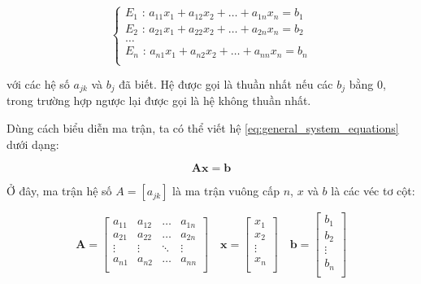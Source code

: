\documentclass[../../Lectures]{subfiles}
\begin{document}
\[\label{eq:general_system_equations}
    \begin{cases}
        E_1 \text{ : } a_{11} x_1 + a_{12} x_2 + \ldots + a_{1n} x_n = b_1 \\
        E_2 \text{ : } a_{21} x_1 + a_{22} x_2 + \ldots + a_{2n} x_n = b_2 \\
        \ldots \\
        E_n \text{ : } a_{n1} x_1 + a_{n2} x_2 + \ldots + a_{nn} x_n = b_n \\
    \end{cases}
\]

\noindent với các hệ số \(a_{jk}\) và \(b_j\) đã biết. Hệ được gọi là thuần nhất
nếu các \(b_j\) bằng \(0\), trong trường hợp ngược lại được gọi là hệ không
thuần nhất.

Dùng cách biểu diễn ma trận, ta có thể viết hệ
\eqref{eq:general_system_equations} dưới dạng:

\begin{equation}
    \bm{A x} = \bm{b}
\end{equation}

Ở đây, ma trận hệ số \(A = [a_{jk}]\) là ma trận vuông cấp \(n\), \(x\) và \(b\)
là các véc tơ cột:

\[
    \bm{A} =
        \begin{bmatrix}
            a_{11}  &  a_{12}  &  \dots   &  a_{1n}  \\
            a_{21}  &  a_{22}  &  \dots   &  a_{2n}  \\
            \vdots  &  \vdots  &  \ddots  &  \vdots  \\
            a_{n1}  &  a_{n2}  &  \dots   &  a_{nn}  \\
        \end{bmatrix} \quad
    \bm{x} =
        \begin{bmatrix}
            x_1     \\
            x_2     \\
            \vdots  \\
            x_n     \\
        \end{bmatrix} \quad
    \bm{b} =
        \begin{bmatrix}
            b_1     \\
            b_2     \\
            \vdots  \\
            b_n     \\
        \end{bmatrix}
\]
\end{document}
